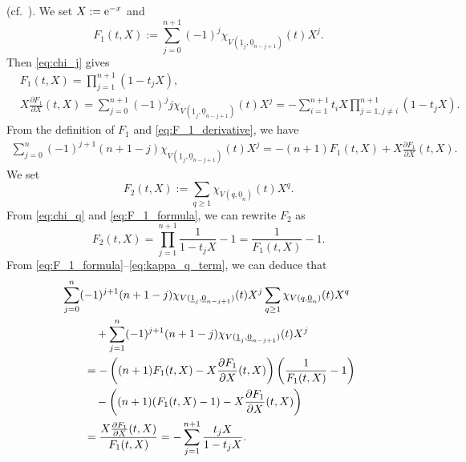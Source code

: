 \documentclass[10pt,a4paper]{amsart}
\numberwithin{equation}{section}
\begin{document}
(cf.~\cite[equations (6.1) and (6.2)]{Fulton-Harris-04}).
We set $X := {\rm e}^{-x}$
and
\[
 F_1 ( t , X)
 :=
 \sum_{j=0}^{n+1}
 (-1)^j
 \chi_{V ( \underline{1}_{j} ,\underline{0}_{n-j+1} )} ( t )
 X^j
 .
\]
Then \eqref{eq:chi_j} gives
\begin{align}
& F_1 ( t ,X)
 =
 \prod_{j=1}^{n+1}
 (1 - t_j X)
 ,
 \label{eq:F_1_formula}
 \\
& X \frac{\partial F_1}{\partial X} ( t , X)
 =
 \sum_{j=0}^{n+1}
 (-1)^j
 j
 \chi_{V ( \underline{1}_{j} ,\underline{0}_{n-j+1} )} ( t )
 X^j
 =
 -
 \sum_{i=1}^{n+1}
 t_i X
 \prod_{j=1, j \not = i }^{n+1}
 (1 - t_j X)
 .
 \label{eq:F_1_derivative}
\end{align}
From the definition of $F_1$ and \eqref{eq:F_1_derivative},
we have
\begin{align}
 \sum_{j=0}^{n}
 (-1 )^{j+1} (n+1-j)
 \chi_{V ( \underline{1}_{j} ,\underline{0}_{n-j+1} )} ( t )
 X^j
 =
 - (n+1 ) F_1 ( t , X )
 + X \frac{\partial F_1 }{\partial X} ( t , X )
 .
 \label{eq:kappa_j_term}
\end{align}
%
We set
\[
 F_2 ( t ,X )
 :=
 \sum_{q \geq 1 }
 \chi_{V ( q, \underline{0}_{n} )} ( t ) X^q .
\]
From \eqref{eq:chi_q} and \eqref{eq:F_1_formula},
we can rewrite $F_2$ as
\begin{equation}
 F_2 ( t , X)
 =
 \prod_{j=1}^{n+1}
 \frac{1}{1 - t_j X} -1
 =
 \frac{1}{F_1 ( t , X)} -1
 .
 \label{eq:kappa_q_term}
\end{equation}
From \eqref{eq:F_1_formula}--\eqref{eq:kappa_q_term},
we can deduce that
\begin{align}
 &
 \sum_{j=0}^{n}
 (-1 )^{j+1} (n+1-j)
 \chi_{V ( \underline{1}_{j} ,\underline{0}_{n-j+1} )} ( t )
 X^j
 \sum_{q \geq 1 }
 \chi_{V ( q, \underline{0}_{n} )} ( t ) X^q
 \notag
 \\
 &
 \qquad \quad{}+
 \sum_{j=1}^{n}
 (-1 )^{j+1} (n+1-j)
 \chi_{V ( \underline{1}_{j} ,\underline{0}_{n-j+1} )} ( t )
 X^j
 \notag
 \\
 & \qquad{}=
 -
 \left(
 (n+1) F_1 ( t,X) - X \frac{\partial F_1}{\partial X} ( t , X )
 \right)
 \left(
 \frac{1}{F_1 ( t , X ) } -1
 \right)
 \notag
 \\
 & \qquad \quad{}
 -
 \left(
 (n+1)( F_1 ( t , X ) -1 )
 - X \frac{\partial F_1}{\partial X} ( t , X )
 \right)
 \notag \\
 & \qquad{}=
 \frac{X \frac{\partial F_1}{\partial X} ( t , X )}{F_1 ( t , X )}
 =
 -
 \sum_{j=1}^{n+1} \frac{t_j X}{1 - t_j X }
 .
 \label{eq:kappa_contents_of_inte}
\end{align}
\end{document}
